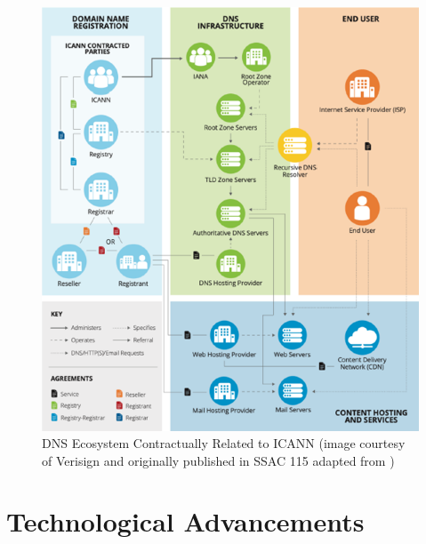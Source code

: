 \captionsetup{font= footnotesize}
\begin{figure}[H]
\centering
    \includegraphics[width=0.9\linewidth]{background/DNSECO.png}
    \caption{DNS Ecosystem Contractually Related to ICANN (image
courtesy of Verisign and originally published in SSAC 115 adapted from \cite{SSAC2023SAC115})}
    \label{fig:fig14}
\end{figure}


\section{Technological Advancements}

